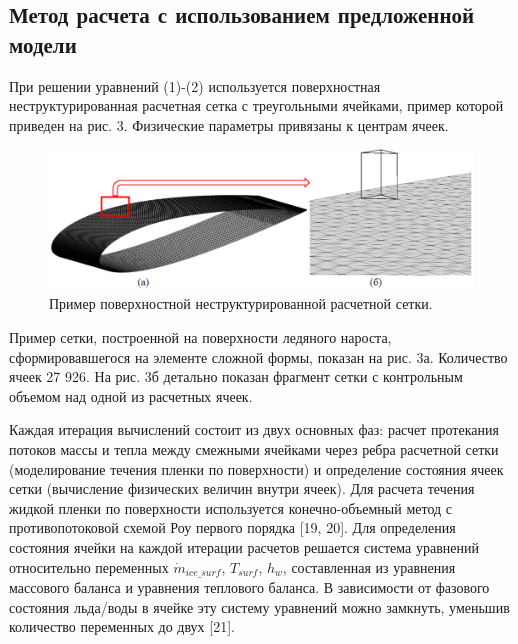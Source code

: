 \documentclass{psta}%
\begin{document}
\subsection{Метод расчета с использованием предложенной модели}

При решении уравнений (1)-(2) используется поверхностная неструктурированная расчетная сетка с треугольными ячейками, пример которой приведен на рис. 3.
Физические параметры привязаны к центрам ячеек.

\begin{figure}[ht]
\centering
\includegraphics[width=1.0\textwidth]{pics/surf_mesh.png}
\caption{Пример поверхностной неструктурированной расчетной сетки.}
\label{fig:surf_mesh}
\end{figure}

Пример сетки, построенной на поверхности ледяного нароста, сформировавшегося на элементе сложной формы, показан на рис. 3а.
Количество ячеек 27 926. На рис. 3б детально показан фрагмент сетки с контрольным объемом над одной из расчетных ячеек.

Каждая итерация вычислений состоит из двух основных фаз: расчет протекания потоков массы и тепла между смежными ячейками через ребра расчетной сетки (моделирование течения пленки по поверхности) и определение состояния ячеек сетки (вычисление физических величин внутри ячеек).
Для расчета течения жидкой пленки по поверхности используется конечно-объемный метод с противопотоковой схемой Роу первого порядка [19, 20]. 
Для определения состояния ячейки на каждой итерации расчетов решается система уравнений относительно переменных $\dot{m}_{ice\_surf}$, $T_{surf}$, $h_w$, составленная из уравнения массового баланса и уравнения теплового баланса.
В зависимости от фазового состояния льда/воды в ячейке эту систему уравнений можно замкнуть, уменьшив количество переменных до двух [21].
\end{document}
